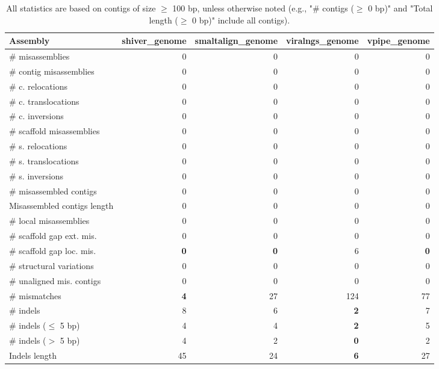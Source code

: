 \documentclass[12pt,a4paper]{article}
\begin{document}
\begin{table}[ht]
\begin{center}
\caption{All statistics are based on contigs of size $\geq$ 100 bp, unless otherwise noted (e.g., "\# contigs ($\geq$ 0 bp)" and "Total length ($\geq$ 0 bp)" include all contigs).}
\begin{tabular}{|l*{4}{|r}|}
\hline
Assembly & shiver\_genome & smaltalign\_genome & viralngs\_genome & vpipe\_genome \\ \hline
\# misassemblies & 0 & 0 & 0 & 0 \\ \hline
\hspace{2mm}\# contig misassemblies & 0 & 0 & 0 & 0 \\ \hline
\hspace{5mm}\# c. relocations & 0 & 0 & 0 & 0 \\ \hline
\hspace{5mm}\# c. translocations & 0 & 0 & 0 & 0 \\ \hline
\hspace{5mm}\# c. inversions & 0 & 0 & 0 & 0 \\ \hline
\hspace{2mm}\# scaffold misassemblies & 0 & 0 & 0 & 0 \\ \hline
\hspace{5mm}\# s. relocations & 0 & 0 & 0 & 0 \\ \hline
\hspace{5mm}\# s. translocations & 0 & 0 & 0 & 0 \\ \hline
\hspace{5mm}\# s. inversions & 0 & 0 & 0 & 0 \\ \hline
\# misassembled contigs & 0 & 0 & 0 & 0 \\ \hline
Misassembled contigs length & 0 & 0 & 0 & 0 \\ \hline
\# local misassemblies & 0 & 0 & 0 & 0 \\ \hline
\# scaffold gap ext. mis. & 0 & 0 & 0 & 0 \\ \hline
\# scaffold gap loc. mis. & {\bf 0} & {\bf 0} & 6 & {\bf 0} \\ \hline
\# structural variations & 0 & 0 & 0 & 0 \\ \hline
\# unaligned mis. contigs & 0 & 0 & 0 & 0 \\ \hline
\# mismatches & {\bf 4} & 27 & 124 & 77 \\ \hline
\# indels & 8 & 6 & {\bf 2} & 7 \\ \hline
\hspace{5mm}\# indels ($\leq$ 5 bp) & 4 & 4 & {\bf 2} & 5 \\ \hline
\hspace{5mm}\# indels ($>$ 5 bp) & 4 & 2 & {\bf 0} & 2 \\ \hline
Indels length & 45 & 24 & {\bf 6} & 27 \\ \hline
\end{tabular}
\end{center}
\end{table}
\end{document}
